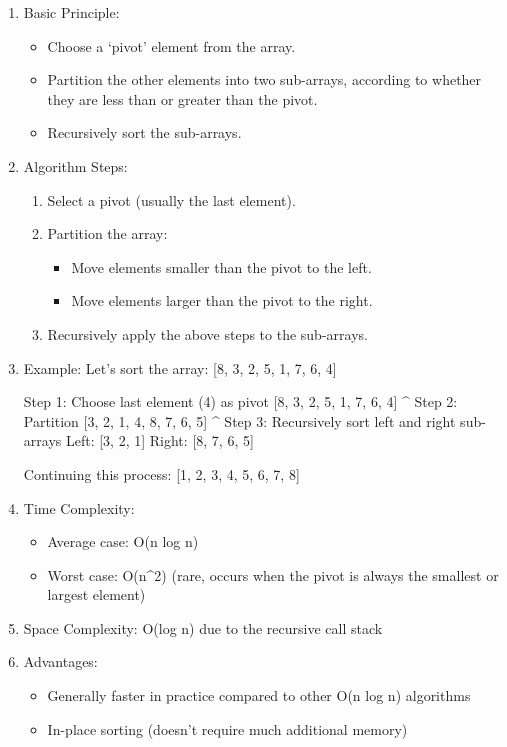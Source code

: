 \begin{enumerate}
\def\labelenumi{\arabic{enumi}.}
\item
  Basic Principle:

  \begin{itemize}
  \tightlist
  \item
    Choose a `pivot' element from the array.
  \item
    Partition the other elements into two sub-arrays, according to
    whether they are less than or greater than the pivot.
  \item
    Recursively sort the sub-arrays.
  \end{itemize}
\item
  Algorithm Steps:

  \begin{enumerate}
  \def\labelenumii{\alph{enumii}.}
  \tightlist
  \item
    Select a pivot (usually the last element).
  \item
    Partition the array:

    \begin{itemize}
    \tightlist
    \item
      Move elements smaller than the pivot to the left.
    \item
      Move elements larger than the pivot to the right.
    \end{itemize}
  \item
    Recursively apply the above steps to the sub-arrays.
  \end{enumerate}
\item
  Example: Let's sort the array: {[}8, 3, 2, 5, 1, 7, 6, 4{]}

  Step 1: Choose last element (4) as pivot {[}8, 3, 2, 5, 1, 7, 6, 4{]}
  \^{} Step 2: Partition {[}3, 2, 1, 4, 8, 7, 6, 5{]} \^{} Step 3:
  Recursively sort left and right sub-arrays Left: {[}3, 2, 1{]} Right:
  {[}8, 7, 6, 5{]}

  Continuing this process: {[}1, 2, 3, 4, 5, 6, 7, 8{]}
\item
  Time Complexity:

  \begin{itemize}
  \tightlist
  \item
    Average case: O(n log n)
  \item
    Worst case: O(n\^{}2) (rare, occurs when the pivot is always the
    smallest or largest element)
  \end{itemize}
\item
  Space Complexity: O(log n) due to the recursive call stack
\item
  Advantages:

  \begin{itemize}
  \tightlist
  \item
    Generally faster in practice compared to other O(n log n) algorithms
  \item
    In-place sorting (doesn't require much additional memory)
  \end{itemize}
\end{enumerate}

